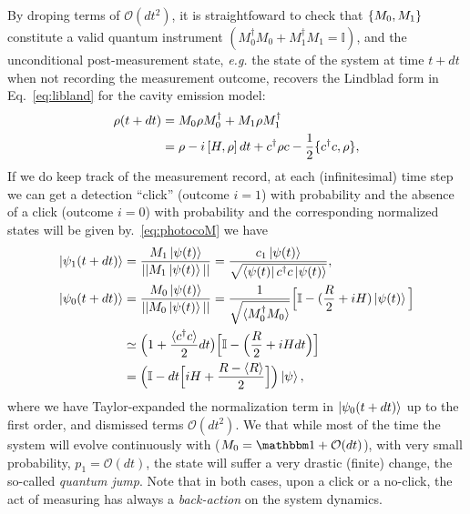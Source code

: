 By droping terms of $\mathcal{O}(dt^2)$, it is straightfoward to check that $\lbrace M_0, M_1\rbrace$ constitute a valid quantum instrument $(M_0^\dagger M_0 + M_1^\dagger M_1 = \mathbb{I})$, and the unconditional post-measurement state, \textit{e.g.} the state of the system at time $t+dt$ when not recording the measurement outcome, recovers the Lindblad form in Eq.~\ref{eq:libland} for the cavity emission model:
\begin{align}\label{eq:cavityemission}
\rho(t+dt) &= M_0 \rho M_0^\dagger + M_1 \rho M_1^\dagger \\
&= \rho - i \left[ H,\rho \right] dt + c^\dagger \rho c - \frac{1}{2}\lbrace c^\dagger c, \rho\rbrace,
\end{align}
If we do keep track of the measurement record, at each (infinitesimal) time step we can get a detection
``click'' (outcome $i=1$) with probability
and the absence of a click (outcome $i=0$) with probability
and the corresponding normalized states will be given by.~\ref{eq:photocoM} we have
\begin{align}
\ket{\psi_1(t+dt)} &= \frac{M_1\ket{\psi(t)}}{|| M_1\ket{\psi(t)}||}=\frac{c_1 \ket{\psi(t)}}{\sqrt{\bra{\psi(t)} c^\dagger c\ket{\psi(t)}}},\\
\ket{\psi_0(t+dt)} &= \frac{M_0\ket{\psi(t)}}{|| M_0\ket{\psi(t)}||}=\frac{1}{\sqrt{ \expect{M_0^\dagger M_0}}} \Big[\mathbb{I} - (\frac{R}{2} + \ii H) \ket{\psi(t)}\Big] \\ \nonumber
&\simeq \Big( 1 + \frac{\expect{c^\dagger c}}{2} dt\big) \Big[ \mathbb{I} - \Big(\frac{R}{2} + \ii H dt\Big)\Big] \nonumber \\
&= \Big(\mathbb{I} - dt\Big[ \ii H + \frac{R - \expect{R}}{2}  \Big] \Big) \ket{\psi},
\end{align}
where we have Taylor-expanded the normalization term in $\ket{\psi_0(t+dt)}$ up to the first order, and dismissed terms $\mathcal{O}(dt^2)$. We that while most of the time the system will evolve continuously with ($M_{0}=\id + \mathcal{O}(dt)$), with very small probability, $p_{1}=\mathcal{O}(dt)$, the state will suffer a very drastic (finite)  change, the so-called \textit{quantum jump}. Note that in both cases, upon a click or a no-click, the act of measuring has always a \emph{back-action} on the system dynamics.


